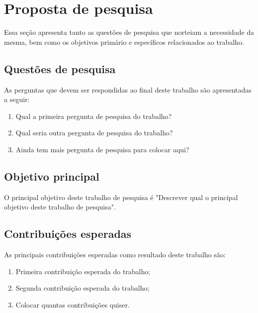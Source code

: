 \chapter{Proposta de pesquisa}\label{cap:proposta_de_pesquisa}

Essa seção apresenta tanto as questões de pesquisa que norteiam a necessidade da mesma, bem como os objetivos primário e específicos relacionados ao trabalho.

\section{Questões de pesquisa} \label{sub:questpesq}

As perguntas que devem %
ser respondidas ao final deste trabalho são apresentadas a seguir:

\begin{enumerate}[leftmargin=*, label=QP\arabic*:]
    \item Qual a primeira pergunta de pesquisa do trabalho?
    \item Qual seria outra pergunta de pesquisa do trabalho?
    \item Ainda tem mais pergunta de pesquisa para colocar aqui?
\end{enumerate}

\section{Objetivo principal}

O principal objetivo deste trabalho de pesquisa é "Descrever qual o principal objetivo deste trabalho de pesquisa".


\section{Contribuições esperadas}
As principais contribuições esperadas como resultado deste trabalho são:

\begin{enumerate}[leftmargin=*, label=CE\arabic*:]
    \item Primeira contribuição esperada do trabalho;
    \item Segunda contribuição esperada do trabalho;
    \item Colocar quantas contribuições quiser.
\end{enumerate}